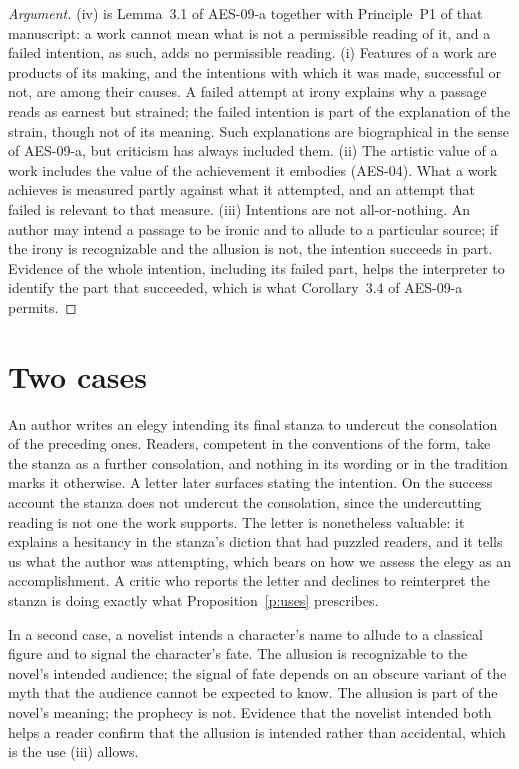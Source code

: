 \documentclass{situationist-preprint}
\begin{document}
\begin{proof}[Argument]
(iv) is Lemma~3.1 of AES-09-a together with Principle~P1 of that manuscript: a work cannot mean what is not a permissible reading of it, and a failed intention, as such, adds no permissible reading. (i) Features of a work are products of its making, and the intentions with which it was made, successful or not, are among their causes. A failed attempt at irony explains why a passage reads as earnest but strained; the failed intention is part of the explanation of the strain, though not of its meaning. Such explanations are biographical in the sense of AES-09-a, but criticism has always included them. (ii) The artistic value of a work includes the value of the achievement it embodies (AES-04). What a work achieves is measured partly against what it attempted, and an attempt that failed is relevant to that measure. (iii) Intentions are not all-or-nothing. An author may intend a passage to be ironic and to allude to a particular source; if the irony is recognizable and the allusion is not, the intention succeeds in part. Evidence of the whole intention, including its failed part, helps the interpreter to identify the part that succeeded, which is what Corollary~3.4 of AES-09-a permits.
\end{proof}

\section{Two cases}

An author writes an elegy intending its final stanza to undercut the consolation of the preceding ones. Readers, competent in the conventions of the form, take the stanza as a further consolation, and nothing in its wording or in the tradition marks it otherwise. A letter later surfaces stating the intention. On the success account the stanza does not undercut the consolation, since the undercutting reading is not one the work supports. The letter is nonetheless valuable: it explains a hesitancy in the stanza's diction that had puzzled readers, and it tells us what the author was attempting, which bears on how we assess the elegy as an accomplishment. A critic who reports the letter and declines to reinterpret the stanza is doing exactly what Proposition~\ref{p:uses} prescribes.

In a second case, a novelist intends a character's name to allude to a classical figure and to signal the character's fate. The allusion is recognizable to the novel's intended audience; the signal of fate depends on an obscure variant of the myth that the audience cannot be expected to know. The allusion is part of the novel's meaning; the prophecy is not. Evidence that the novelist intended both helps a reader confirm that the allusion is intended rather than accidental, which is the use (iii) allows.
\end{document}
